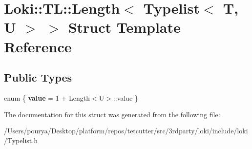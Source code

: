 \hypertarget{structLoki_1_1TL_1_1Length_3_01Typelist_3_01T_00_01U_01_4_01_4}{}\section{Loki\+:\+:T\+L\+:\+:Length$<$ Typelist$<$ T, U $>$ $>$ Struct Template Reference}
\label{structLoki_1_1TL_1_1Length_3_01Typelist_3_01T_00_01U_01_4_01_4}
\subsection*{Public Types}
\begin{DoxyCompactItemize}
\item 
\hypertarget{structLoki_1_1TL_1_1Length_3_01Typelist_3_01T_00_01U_01_4_01_4_a6f2071e8ae956ca73400a4693b1a0c71}{}enum \{ {\bfseries value} = 1 + Length$<$U$>$\+:\+:value
 \}\label{structLoki_1_1TL_1_1Length_3_01Typelist_3_01T_00_01U_01_4_01_4_a6f2071e8ae956ca73400a4693b1a0c71}

\end{DoxyCompactItemize}


The documentation for this struct was generated from the following file\+:\begin{DoxyCompactItemize}
\item 
/\+Users/pourya/\+Desktop/platform/repos/tetcutter/src/3rdparty/loki/include/loki/Typelist.\+h\end{DoxyCompactItemize}
